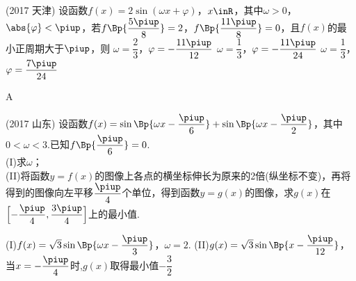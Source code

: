 \begin{exercise}
        \vspace{-0.9cm}
      \item%
            {\kaishu (2017 \textbullet 天津)}
            设函数$f(x)=2\sin(\omega x+\varphi)$，$x\inR$，其中$\omega>0$，$\abs{\varphi}<\piup$，若$f\Bp{\dfrac{5\piup}8}=2$，$f\Bp{\dfrac{11\piup}8}=0$，且$f(x)$的最小正周期大于$\piup$，则\xz
             {$\omega=\dfrac23$，$\varphi=-\dfrac{11\piup}{12}$}
             {$\omega=\dfrac13$，$\varphi=-\dfrac{11\piup}{24}$}
             {$\omega=\dfrac13$，$\varphi=\dfrac{7\piup}{24}$}
            \begin{answer}
              A
            \end{answer}
      \vspace{2em}
      \item%
            {\kaishu (2017 \textbullet 山东)}
            设函数$f(x)=\sin\Bp{\omega x-\dfrac{\piup}6}+\sin\Bp{\omega x-\dfrac{\piup}2}$，其中$0<\omega<3$.已知$f\Bp{\dfrac{\piup}6}=0$.\\
            (I)求$\omega$；\\
            (II)将函数$y=f(x)$的图像上各点的横坐标伸长为原来的2倍(纵坐标不变)，再将得到的图像向左平移$\dfrac{\piup}4$个单位，得到函数$y=g(x)$的图像，求$g(x)$在$\Bigl[-\dfrac{\piup}4,\dfrac{3\piup}4\Bigr]$上的最小值.
            \begin{answer}
              (I)$f(x)=\sqrt3\sin\Bp{\omega x-\dfrac{\piup}3}$，$\omega=2$.
              (II)$g(x)=\sqrt3\sin\Bp{x-\dfrac{\piup}{12}}$，当$x=-\dfrac{\piup}4$时,$g(x)$取得最小值$-\dfrac32$
            \end{answer}
      \vspace{5cm}
    \end{exercise}
    \clearpage
